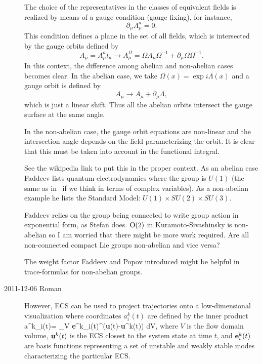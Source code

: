 \begin{description}
\begin{ttfamily}
The choice of the representatives in the classes of equivalent fields is
realized by means of a gauge condition (gauge fixing), for instance,
\[
    \partial_{\mu} A_{\mu}^{a} = 0 .
\]
This condition defines a plane in the set of all fields, which is
intersected by the gauge orbits defined by
\[
    A_{\mu} = A_{\mu}^{a}t_{a} \to A_{\mu}^{\Omega}
            = \Omega A_{\mu} \Omega^{-1} + \partial_{\mu} \Omega \Omega^{-1} .
\]
In this context, the difference among abelian and non-abelian cases
becomes clear. In the abelian case, we take $\Omega(x) =
\exp{i\Lambda(x)}$ and a gauge orbit is defined by
\[
    A_{\mu} \to A_{\mu} + \partial_{\mu} \Lambda ,
\]
which is just a linear shift. Thus all the abelian orbits intersect the
gauge surface at the same angle.

In the non-abelian case, the gauge orbit equations are non-linear and the
intersection angle depends on the field parameterizing the orbit. It is
clear that this must be taken into account in the functional integral.
\end{ttfamily}

See the wikipedia link to put this in the proper context. As an abelian
case Faddeev lists quantum electrodynamics where the group is $U(1)$ (the
same as in \cLe\ if we think in terms of complex variables). As a
non-abelian example he lists the Standard Model: $U(1)\times SU(2) \times
SU(3)$.

Faddeev relies on the group being connected to write group action in
exponential form, as Stefan does. $\textrm{O}(2)$ in Kuramoto-Sivashinsky is
non-abelian so I am worried that there might be more work required. Are
all non-connected compact Lie groups non-abelian and vice versa?

The weight factor Faddeev and Popov introduced might be helpful in
trace-formulas for non-abelian groups.

\item[2011-12-06 Roman] However,  ECS can be used to project
trajectories onto a low-dimensional visualization where coordinates $a^k_{i}(t)$
are defined by the inner product
\beq
\label{coordinatesRG}
a^k_{i}(t)=  \int_V {\bf e}^k_i(t)^\dagger\cdot({\bf u}(t)-{\bf u}^k(t)) dV,
\eeq
where $V$ is the flow domain volume, ${\bf u}^k(t)$ is the ECS closest to
the system state at time $t$, and ${\bf e}^k_i(t)$ are basis functions
representing a set of unstable and weakly stable modes characterizing the
particular ECS.


\end{description}
